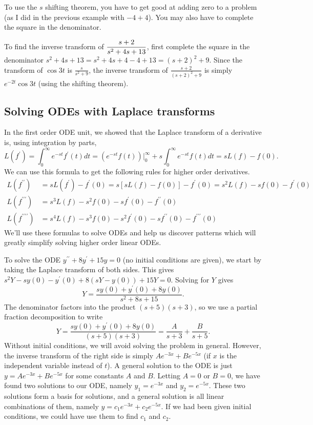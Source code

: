 To use the $s$ shifting theorem, you have to get good at adding zero to a problem (as I did in the previous example with $-4+4$). You may also have to complete the square in the denominator. 



\begin{example}
To find the inverse transform of $\displaystyle \frac{s+2}{s^2+4s+13}$, first complete the square in the denominator $s^2+4s+13 = s^2+4s+4-4+13 = (s+2)^2+9$. Since the transform of $\cos 3t$ is $\frac{s}{s^2+9}$, the inverse transform of $\frac{s+2}{(s+2)^2+9}$ is simply $e^{-2t}\cos 3t$ (using the shifting theorem). 

\end{example}


\subsection{Solving ODEs with Laplace transforms}
In the first order ODE unit, we showed that the Laplace transform of a derivative is, using integration by parts, $$L(f^\prime)=\int_0^\infty e^{-st}f^\prime (t)dt = (e^{-st}f(t))\big|_0^\infty + s\int_0^\infty e^{-st}f (t)dt  = sL(f)-f(0).$$  We can use this formula to get the following rules for higher order derivatives. 
\begin{align*}
L(f^{\prime\prime}) &= sL(f^\prime)-f^\prime(0) = s[sL(f)-f(0)]-f^\prime(0) = s^2L(f) - sf(0)-f^\prime(0)\\
L(f^{\prime\prime\prime}) &= s^3L(f) - s^2f(0)-sf^\prime(0)-f^{\prime\prime}(0)\\
L(f^{\prime\prime\prime\prime}) &= s^4L(f) - s^3f(0)-s^2f^\prime(0)-sf^{\prime\prime}(0)-f^{\prime\prime\prime}(0)
\end{align*} 
We'll use these formulas to solve ODEs and help us discover patterns which will greatly simplify solving higher order linear ODEs. 

\begin{example}
To solve the ODE $y^{\prime\prime}+8y^\prime+15y=0$ (no initial conditions are given), we start by taking the Laplace transform of both sides. This gives $s^2Y-sy(0)-y^\prime(0) + 8(sY-y(0))+15Y=0$.  Solving for $Y$ gives $$Y = \frac{sy(0)+y^\prime(0)+8y(0)}{s^2+8s+15}.$$  The denominator factors into the product $(s+5)(s+3)$, so we use a partial fraction decomposition to write 
$$Y = \frac{sy(0)+y^\prime(0)+8y(0)}{(s+5)(s+3)} = \frac{A}{s+3}+\frac{B}{s+5}.$$
Without initial conditions, we will avoid solving the problem in general. However, the inverse transform of the right side is simply $Ae^{-3x}+Be^{-5x}$ (if $x$ is the independent variable instead of $t$). A general solution to the ODE is just $y=Ae^{-3x}+Be^{-5x}$ for some constants $A$ and $B$. Letting $A=0$ or $B=0$, we have found two solutions to our ODE, namely $y_1=e^{-3x}$ and $y_2=e^{-5x}$. These two solutions form a basis for solutions, and a general solution is all linear combinations of them, namely $y=c_1e^{-3x}+c_2e^{-5x}$. If we had been given initial conditions, we could have use them to find $c_1$ and $c_2$.  
\end{example}

